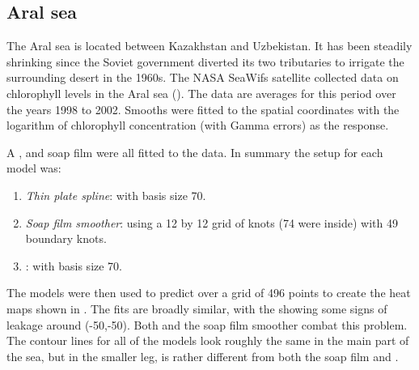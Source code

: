 \subsection{Aral sea}

The Aral sea is located between Kazakhstan and Uzbekistan. It has been steadily shrinking since the Soviet government diverted its two tributaries to irrigate the surrounding desert in the 1960s. The NASA SeaWifs satellite collected data on chlorophyll levels in the Aral sea (\cite{soap}). The data are averages for this period over the years 1998 to 2002. Smooths were fitted to the spatial coordinates with the logarithm of chlorophyll concentration (with Gamma errors) as the response.

A \tprs, \mdsap and soap film were all fitted to the data. In summary the setup for each model was:

\begin{enumerate}
\item \emph{Thin plate spline}:  with basis size 70.
\item \emph{Soap film smoother}: using a 12 by 12 grid of knots (74 were inside) with 49 boundary knots.
\item \emph{\mdsap}: with basis size 70.
\end{enumerate}

The models were then used to predict over a grid of 496 points to create the heat maps shown in . The fits are broadly similar, with the \tprs showing some signs of leakage around (-50,-50). Both \mdsap and the soap film smoother combat this problem. The contour lines for all of the models look roughly the same in the main part of the sea, but in the smaller leg, \mdsap is rather different from both the soap film and \tprs.

